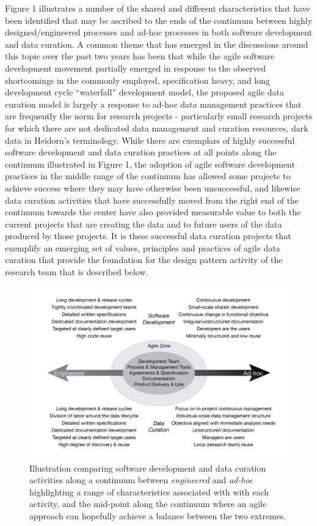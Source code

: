 \documentclass[paper]{ijdc-v9}
\begin{document}
Figure 1 illustrates a number of the shared and different
characteristics that have been identified that may be ascribed to the
ends of the continuum between highly designed/engineered processes and
ad-hoc processes in both software development and data curation. A
common theme that has emerged in the discussions around this topic over
the past two years has been that while the agile software development
movement partially emerged in response to the observed shortcomings in
the commonly employed, specification heavy, and long development cycle
``waterfall'' development model, the proposed agile data curation model
is largely a response to ad-hoc data management practices that are
frequently the norm for research projects - particularly small research
projects for which there are not dedicated data management and curation
resources, dark data in Heidorn's \autocite*{heidorn_shedding_2008}
terminology. While there are exemplars of highly successful software
development and data curation practices at all points along the
continuum illustrated in Figure 1, the adoption of agile software
development practices in the middle range of the continuum has allowed
some projects to achieve success where they may have otherwise been
unsuccessful, and likewise data curation activities that have
successfully moved from the right end of the continuum towards the
center have also provided measurable value to both the current projects
that are creating the data and to future users of the data produced by
those projects. It is these successful data curation projects that
exemplify an emerging set of values, principles and practices of agile
data curation that provide the foundation for the design pattern
activity of the research team that is described below.

\begin{figure}[htbp]
\centering
\includegraphics[width=5.00000in]{agileComparison-01.png}
\caption{Illustration comparing software development and data curation
activities along a continuum between \emph{engineered} and \emph{ad-hoc}
highlighting a range of characteristics associated with with each
activity, and the mid-point along the continuum where an agile approach
can hopefully achieve a balance between the two extremes.}
\end{figure}
\end{document}
